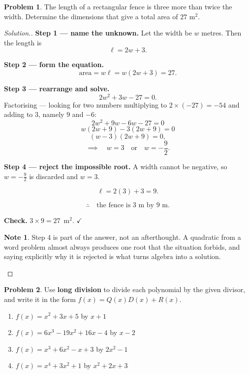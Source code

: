 \documentclass[11pt,a4paper]{article}
\theoremstyle{definition}
\newtheorem{note}[thm]{Note}
\newtheorem{problemx}{Problem}[section]
\newenvironment{problem}{\begin{problemx}}{\end{problemx}}
\newenvironment{solution}
  {\renewcommand{\qedsymbol}{}\begin{proof}[\textit{Solution}.]}
  {\end{proof}}
\let\amscheckmark\checkmark
\renewcommand{\checkmark}{\ensuremath{\amscheckmark}}
\begin{document}
\begin{problem}
The length of a rectangular fence is three more than twice the width. Determine the
dimensions that give a total area of $27\text{ m}^2$.
\end{problem}

\begin{solution}
\textbf{Step 1 --- name the unknown.} Let the width be $w$ metres. Then the length is
$$\ell=2w+3.$$

\textbf{Step 2 --- form the equation.}
$$\text{area}=w\ell=w(2w+3)=27.$$

\textbf{Step 3 --- rearrange and solve.}
$$2w^2+3w-27=0.$$
Factorising --- looking for two numbers multiplying to $2\times(-27)=-54$ and adding to
$3$, namely $9$ and $-6$:
$$2w^2+9w-6w-27=0$$
$$w(2w+9)-3(2w+9)=0$$
$$(w-3)(2w+9)=0,$$
$$\implies\quad w=3\quad\text{or}\quad w=-\frac{9}{2}.$$

\textbf{Step 4 --- reject the impossible root.} A width cannot be negative, so
$w=-\frac{9}{2}$ is discarded and $w=3$.

$$\ell=2(3)+3=9.$$

$$\therefore\quad \text{the fence is } 3\text{ m by } 9\text{ m}.$$

\textbf{Check.} $3\times 9=27$~m$^2$. $\checkmark$

\begin{note}
Step 4 is part of the answer, not an afterthought. A quadratic from a word problem
almost always produces one root that the situation forbids, and saying explicitly why it
is rejected is what turns algebra into a solution.
\end{note}
\end{solution}

\begin{problem}
Use \textbf{long division} to divide each polynomial by the given divisor, and write it
in the form $f(x)=Q(x)D(x)+R(x)$.
\begin{enumerate}
\item[(i).] $f(x)=x^2+3x+5$ by $x+1$
\item[(ii).] $f(x)=6x^3-19x^2+16x-4$ by $x-2$
\item[(iii).] $f(x)=x^3+6x^2-x+3$ by $2x^2-1$
\item[(iv).] $f(x)=x^4+3x^2+1$ by $x^2+2x+3$
\end{enumerate}
\end{problem}
\end{document}
